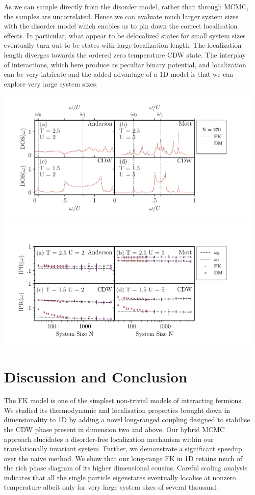 As we can sample directly from the disorder model, rather than through MCMC, the samples are uncorrelated. Hence we can evaluate much larger system sizes with the disorder model which enables us to pin down the correct localisation effects. In particular, what appear to be delocalized states for small system sizes eventually turn out to be states with large localization length. The localization length diverges towards the ordered zero temperature CDW state. The interplay of interactions, which here produce as peculiar binary potential, and localization can be very intricate and the added advantage of a 1D model is that we can explore very large system sizes.

\includegraphics[width=1\textwidth,height=\textheight]{figure_code/fk_chapter/disorder_model/DM_DOS} \includegraphics[width=1\textwidth,height=\textheight]{figure_code/fk_chapter/disorder_model/DM_IPR_scaling}

\hypertarget{fk-conclusion}{%
\section{Discussion and Conclusion}\label{fk-conclusion}}

The FK model is one of the simplest non-trivial models of interacting fermions. We studied its thermodynamic and localisation properties brought down in dimensionality to 1D by adding a novel long-ranged coupling designed to stabilise the CDW phase present in dimension two and above. Our hybrid MCMC approach elucidates a disorder-free localization mechanism within our translationally invariant system. Further, we demonstrate a significant speedup over the naive method. We show that our long-range FK in 1D retains much of the rich phase diagram of its higher dimensional cousins. Careful scaling analysis indicates that all the single particle eigenstates eventually localise at nonzero temperature albeit only for very large system sizes of several thousand.

